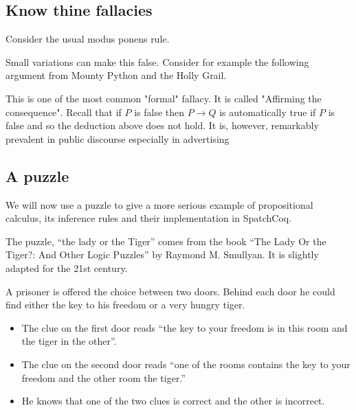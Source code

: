 \subsection{Know thine fallacies}

Consider the usual modus ponens rule. 

Small variations can make this false.
 Consider for example the following argument from Mounty Python and the Holly Grail.
 
 
 
 
 
 
 This is one of the most common "formal" fallacy. It is called "Affirming the consequence". Recall that if $P$ is false then $P\rightarrow Q$ is automatically true if $P$ is false and so the deduction above does not hold. It is, however, remarkably prevalent in public discourse especially in advertising

\subsection{A puzzle}

We will now use a puzzle to give a more serious example	 of propositional calculus, its inference rules and their implementation in SpatchCoq. 

The puzzle, ``the lady or the Tiger'' comes from the book  ``The Lady Or the Tiger?: And Other Logic Puzzles'' by Raymond M. Smullyan. It is slightly adapted for the 21st century.

A  prisoner is offered the choice between two doors. Behind each door he could find either the key to his freedom or a very hungry tiger.

 \begin{itemize}

 \item The clue on the first door reads ``the key to your freedom  is in this room and the tiger in the other''.
 \item The clue on the second door reads ``one of the rooms contains  the key to your freedom and the other room the tiger.''
  \item He knows that one of the two clues is correct and the other is incorrect.
 \end{itemize}

